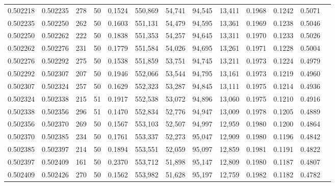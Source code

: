 \begin{tabular}{rrrrrrrrrrrrr}
0.502218 & 0.502235 & 278 &  50 &                                     0.1524 & 550,869 &  54,741 &  94,545 &  13,411 & 0.1968 & 0.1242 & 0.5071 \\
0.502235 & 0.502250 & 262 &  50 &                                     0.1603 & 551,131 &  54,479 &  94,595 &  13,361 & 0.1969 & 0.1238 & 0.5046 \\
0.502250 & 0.502262 & 222 &  50 &                                     0.1838 & 551,353 &  54,257 &  94,645 &  13,311 & 0.1970 & 0.1233 & 0.5026 \\
0.502262 & 0.502276 & 231 &  50 &                                     0.1779 & 551,584 &  54,026 &  94,695 &  13,261 & 0.1971 & 0.1228 & 0.5004 \\
0.502276 & 0.502292 & 275 &  50 &                                     0.1538 & 551,859 &  53,751 &  94,745 &  13,211 & 0.1973 & 0.1224 & 0.4979 \\
0.502292 & 0.502307 & 207 &  50 &                                     0.1946 & 552,066 &  53,544 &  94,795 &  13,161 & 0.1973 & 0.1219 & 0.4960 \\
0.502307 & 0.502324 & 257 &  50 &                                     0.1629 & 552,323 &  53,287 &  94,845 &  13,111 & 0.1975 & 0.1214 & 0.4936 \\
0.502324 & 0.502338 & 215 &  51 &                                     0.1917 & 552,538 &  53,072 &  94,896 &  13,060 & 0.1975 & 0.1210 & 0.4916 \\
0.502338 & 0.502356 & 296 &  51 &                                     0.1470 & 552,834 &  52,776 &  94,947 &  13,009 & 0.1978 & 0.1205 & 0.4889 \\
0.502356 & 0.502370 & 269 &  50 &                                     0.1567 & 553,103 &  52,507 &  94,997 &  12,959 & 0.1980 & 0.1200 & 0.4864 \\
0.502370 & 0.502385 & 234 &  50 &                                     0.1761 & 553,337 &  52,273 &  95,047 &  12,909 & 0.1980 & 0.1196 & 0.4842 \\
0.502385 & 0.502397 & 214 &  50 &                                     0.1894 & 553,551 &  52,059 &  95,097 &  12,859 & 0.1981 & 0.1191 & 0.4822 \\
0.502397 & 0.502409 & 161 &  50 &                                     0.2370 & 553,712 &  51,898 &  95,147 &  12,809 & 0.1980 & 0.1187 & 0.4807 \\
0.502409 & 0.502426 & 270 &  50 &                                     0.1562 & 553,982 &  51,628 &  95,197 &  12,759 & 0.1982 & 0.1182 & 0.4782 \\

\end{tabular}
